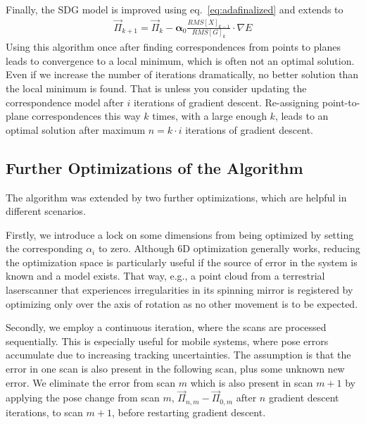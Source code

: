 Finally, the SDG model is improved using eq.~\eqref{eq:adafinalized} and extends to 
\begin{align}
    \vec{\Pi}_{k+1} = \vec{\Pi}_{k} - \boldsymbol\alpha_0  \frac{RMS[X]_{k-1}}{RMS[G]_{k}} \cdot \nabla E
\end{align}
Using this algorithm once after finding correspondences from points to planes leads to convergence to a local minimum, which is often not an optimal solution.
Even if we increase the number of iterations dramatically, no better solution than the local minimum is found.
That is unless you consider updating the correspondence model after $i$ iterations of gradient descent.
Re-assigning point-to-plane correspondences this way $k$ times, with a large enough $k$, leads to an optimal solution after maximum $n = k\cdot i$ iterations of gradient descent.

\subsection{Further Optimizations of the Algorithm}

The algorithm was extended by two further optimizations, which are helpful in different scenarios.

Firstly, we introduce a lock on some dimensions from being optimized by setting the corresponding $\alpha_i$ to zero.
Although 6D optimization generally works, reducing the optimization space is particularly useful if the source of error in the system is known and a model exists.
That way, e.g., a point cloud from a terrestrial laserscanner that experiences irregularities in its spinning mirror is registered by optimizing only over the axis of rotation as no other movement is to be expected.

Secondly, we employ a continuous iteration, where the scans are processed sequentially. 
This is especially useful for mobile systems, where pose errors accumulate due to increasing tracking uncertainties.
The assumption is that the error in one scan is also present in the following scan, plus some unknown new error.
We eliminate the error from scan $m$ which is also present in scan $m+1$ by applying the pose change from scan $m$, $\vec{\Pi}_{n,m} - \vec{\Pi}_{0,m}$ after $n$ gradient descent iterations, to scan $m+1$, before restarting gradient descent.
